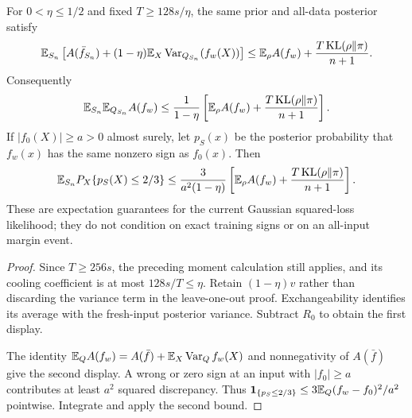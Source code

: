 \begin{corollary}
\label{cor:Gibbs-confidence-expectation}
For $0<\eta\le1/2$ and fixed $T\ge128s/\eta$, the same prior and all-data posterior satisfy
\[
 \mathbb E_{S_n}\left[A(\bar f_{S_n})+(1-\eta)
      \mathbb E_X\operatorname{Var}_{Q_{S_n}}(f_w(X))\right]
 \le\mathbb E_\rho A(f_w)+\frac{T\operatorname{KL}(\rho\|\pi)}{n+1}.
\]
Consequently
\[
 \mathbb E_{S_n}\mathbb E_{Q_{S_n}}A(f_w)
 \le\frac1{1-\eta}
       \left[\mathbb E_\rho A(f_w)+\frac{T\operatorname{KL}(\rho\|\pi)}{n+1}\right].
\]
If $|f_0(X)|\ge a>0$ almost surely, let $p_S(x)$ be the posterior probability that $f_w(x)$ has the same nonzero sign as $f_0(x)$. Then
\[
 \mathbb E_{S_n}P_X\{p_S(X)\le2/3\}
 \le\frac3{a^2(1-\eta)}
       \left[\mathbb E_\rho A(f_w)+\frac{T\operatorname{KL}(\rho\|\pi)}{n+1}\right].
\]
These are expectation guarantees for the current Gaussian squared-loss likelihood; they do not condition on exact training signs or on an all-input margin event.
\end{corollary}
\begin{proof}
Since $T\ge256s$, the preceding moment calculation still applies, and its cooling coefficient is at most $128s/T\le\eta$. Retain $(1-\eta)v$ rather than discarding the variance term in the leave-one-out proof. Exchangeability identifies its average with the fresh-input posterior variance. Subtract $R_0$ to obtain the first display.

The identity $\mathbb E_Q A(f_w)=A(\bar f)+\mathbb E_X\operatorname{Var}_Q f_w(X)$ and nonnegativity of $A(\bar f)$ give the second display. A wrong or zero sign at an input with $|f_0|\ge a$ contributes at least $a^2$ squared discrepancy. Thus
$\mathbf1_{\{p_S\le2/3\}}\le3\mathbb E_Q(f_w-f_0)^2/a^2$ pointwise. Integrate and apply the second bound.
\end{proof}
